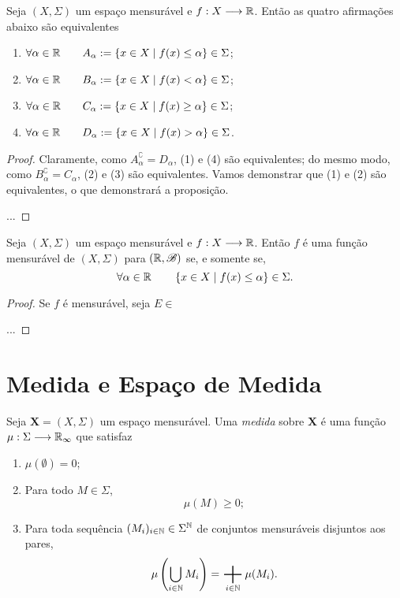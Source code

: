 \begin{prop}
	Seja $(X,\Sigma)$ um espaço mensurável e $f: X \longrightarrow \mathbb{R}$. Então as quatro afirmações abaixo são equivalentes
	\begin{enumerate}
	\item $\forall \alpha \in \mathbb{R} \qquad A_\alpha := \left\{x \in X \;\middle\vert\; f(x) \leq \alpha \right\} \in \Sigma$;
	\item $\forall \alpha \in \mathbb{R} \qquad B_\alpha := \left\{x \in X \;\middle\vert\; f(x) < \alpha \right\} \in \Sigma$;
	\item $\forall \alpha \in \mathbb{R} \qquad C_\alpha := \left\{x \in X \;\middle\vert\; f(x) \geq \alpha \right\} \in \Sigma$;
	\item $\forall \alpha \in \mathbb{R} \qquad D_\alpha := \left\{x \in X \;\middle\vert\; f(x) > \alpha \right\} \in \Sigma$.
	\end{enumerate}
\end{prop}
\begin{proof}
	Claramente, como $A_\alpha^\complement = D_\alpha$, (1) e (4) são equivalentes; do mesmo modo, como $B_\alpha^\complement = C_\alpha$, (2) e (3) são equivalentes. Vamos demonstrar que (1) e (2) são equivalentes, o que demonstrará a proposição.
	
	...	
\end{proof}

\begin{prop}
	Seja $(X,\Sigma)$ um espaço mensurável e $f: X \longrightarrow \mathbb{R}$. Então $f$ é uma função mensurável de $(X,\Sigma)$ para $(\mathbb{R},\mathscr{B})$ se, e somente se,
	\begin{equation*}
	\forall \alpha \in \mathbb{R} \qquad \left\{x \in X \;\middle\vert\; f(x) \leq \alpha \right\} \in \Sigma.
	\end{equation*}
\end{prop}
\begin{proof}
	Se $f$ é mensurável, seja $E \in$
	
	...
\end{proof}
\newpage









\section{Medida e Espaço de Medida}

\begin{defi}
Seja $\bm X=(X,\Sigma)$ um espaço mensurável. Uma \emph{medida} sobre $\bm X$ é uma função $\mu : \Sigma \longrightarrow \mathbb{R}_\infty$ que satisfaz
	\begin{enumerate}
	\item $\mu(\emptyset)=0$;
	\item Para todo $M \in \Sigma$,
	\begin{equation*}
	\mu(M) \geq 0;
	\end{equation*}
	\item Para toda sequência $(M_i)_{i \in \mathbb{N}} \in \Sigma^{\mathbb{N}}$ de conjuntos mensuráveis disjuntos aos pares,
	\begin{equation*}
	\mu\left(\bigcup_{i \in \N} M_i\right)=\bigplus_{i \in \N} \mu(M_i).
	\end{equation*}
	\end{enumerate}
\end{defi}

